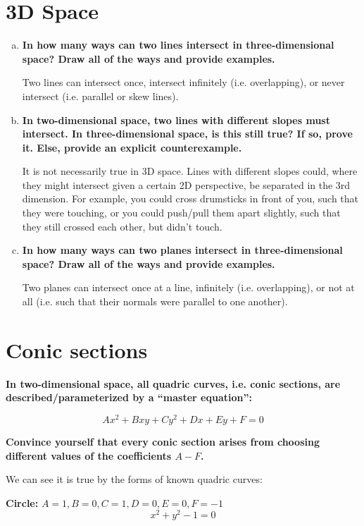\documentclass{article}
\begin{document}
\section{3D Space}
\begin{enumerate}[a.]
    \item\textbf{ In how many ways can two lines intersect in three-dimensional space? Draw all of the ways and provide examples.} 
    
    Two lines can intersect once, intersect infinitely (i.e. overlapping), or never intersect (i.e. parallel or skew lines).
    
    \item\textbf{ In two-dimensional space, two lines with different slopes must intersect. In three-dimensional space, is this still true? If so, prove it. Else, provide an explicit counterexample.}
    
    It is not necessarily true in 3D space. Lines with different slopes could, where they might intersect given a certain 2D perspective, be separated in the 3rd dimension. For example, you could cross drumsticks in front of you, such that they were touching, or you could push/pull them apart slightly, such that they still crossed each other, but didn't touch.
    
    \item\textbf{ In how many ways can two planes intersect in three-dimensional space? Draw all of the ways and provide examples.} 
    
    Two planes can intersect once at a line, infinitely (i.e. overlapping), or not at all (i.e. such that their normals were parallel to one another).
\end{enumerate}
	  
\section{Conic sections}
\textbf{In two-dimensional space, all quadric curves, i.e. conic sections, are described/parameterized by a “master equation”:}

\[Ax^{2} + Bxy + Cy^2 + Dx + Ey + F = 0\]

\textbf{Convince yourself that every conic section arises from choosing different values of the coefficients $A-F$.}\newline

We can see it is true by the forms of known quadric curves: \newline

\hspace{1cm} \textbf{Circle:} $A=1, B=0, C=1, D=0, E=0, F=-1$
    \[x^2 + y^2 - 1 = 0\]
\end{document}
